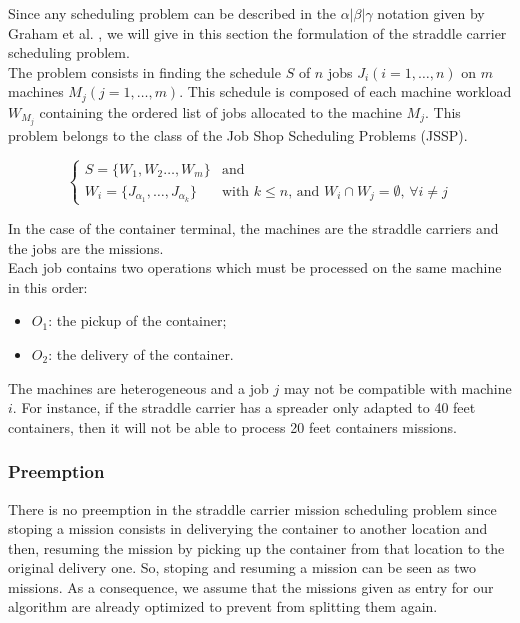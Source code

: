 \documentclass[a4paper,10pt]{article}
\begin{document}
Since any scheduling problem can be described in the $\alpha|\beta|\gamma$ notation given by Graham et al. \cite{Graham1979}, we will give in this section the formulation of the straddle carrier scheduling problem.\\

The problem consists in finding the schedule $S$ of $n$ jobs $J_i(i=1,\ldots,n)$ on $m$ machines $M_j(j=1,\ldots,m)$. 
This schedule is composed of each machine workload $W_{M_j}$ containing the ordered list of jobs allocated to the machine $M_j$. This problem belongs to the class of the Job Shop Scheduling Problems (JSSP).

\begin{equation*}
\begin{cases}
 S = \{ W_{1} , W_{2} \ldots , W_{m}\} & \text{and}\\
 W_{i} = \{ J_{\alpha_1} , \ldots , J_{\alpha_k} \} & \text{with $k \leq n$, and $W_{i} \cap W_{j} = \emptyset$,  $\forall i \neq j$} 
\end{cases}
\end{equation*}


In the case of the container terminal, the machines are the straddle carriers and the jobs are the missions.\\
 
Each job contains two operations which must be processed on the same machine in this order:
\begin{itemize}
 \item $O_1$: the pickup of the container;
 \item $O_2$: the delivery of the container.
\end{itemize}

The machines are heterogeneous and a job $j$ may not be compatible with machine $i$. For instance, if the straddle carrier has a spreader only adapted to 40 feet containers, then it will not be able to process 20 feet containers missions.

\subsubsection{Preemption}
There is no preemption in the straddle carrier mission scheduling problem since stoping a mission consists in deliverying the container to another location and then, resuming the mission by picking up the container from that location to the original delivery one. So, stoping and resuming a mission can be seen as two missions. As a consequence, we assume that the missions given as entry for our algorithm are already optimized to prevent from splitting them again.
\end{document}
